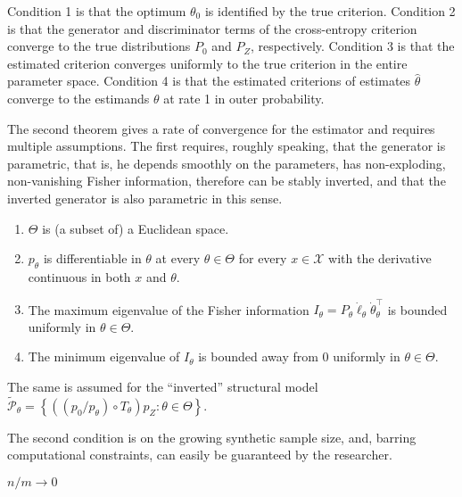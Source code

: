 Condition 1 is that the optimum $\theta_0$ is identified by the true criterion.
Condition 2 is that the generator and discriminator terms of the cross-entropy criterion converge to the true distributions $P_0$ and $P_Z$, respectively. %
Condition 3 is that the estimated criterion converges uniformly to the true criterion in the entire parameter space.
Condition 4 is that the estimated criterions of estimates $\hat{\theta}$ converge to the estimands $\theta$ at rate 1 in outer probability. %

The second theorem gives a rate of convergence for the estimator and requires multiple assumptions.
The first requires, roughly speaking, that the generator is parametric, that is, he depends smoothly on the parameters, has non-exploding, non-vanishing Fisher information, therefore can be stably inverted, and that the inverted generator is also parametric in this sense. %

\begin{assumption}[A1, KMP]
    \label{a:1}
    \begin{enumerate}
        \item $\Theta$ is (a subset of) a Euclidean space.
        \item $p_{\theta}$ is differentiable in $\theta$ at every $\theta \in \Theta$ for every $x \in \mathcal{X}$ with the derivative continuous in both $x$ and $\theta$.
        \item The maximum eigenvalue of the Fisher information $I_{\theta}=P_{\theta} \dot{\ell}_{\theta} \dot{\theta}_{\theta}^{\top}$ is bounded uniformly in $\theta \in \Theta$.
        \item The minimum eigenvalue of $I_{\theta}$ is bounded away from 0 uniformly in $\theta \in \Theta$.
    \end{enumerate}
    The same is assumed for the ``inverted'' structural model $\widetilde{\mathcal{P}}_{\theta}=\left\{\left(\left(p_{0} / p_{\theta}\right) \circ T_{\theta}\right) p_{Z}: \theta \in \Theta\right\}$.
\end{assumption}

The second condition is on the growing synthetic sample size, and, barring computational constraints, can easily be guaranteed by the researcher. %
\begin{assumption}[A2, KMP]
    \label{a:2}
    $n/m \rightarrow 0$
\end{assumption}

